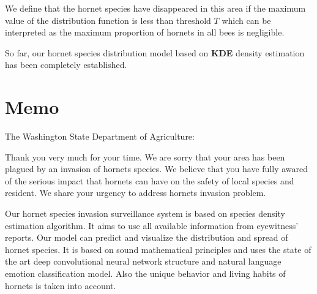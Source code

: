 \documentclass[12pt]{article}
\begin{document}
We define that the hornet species have disappeared in this area if the maximum value of the distribution function is less than threshold $T$ which can be interpreted as the maximum proportion of hornets in all bees is negligible.

So far, our hornet species distribution model based on \textbf{KDE} density estimation has been completely established.

\clearpage
\section*{Memo}

\begin{flushleft}
	The Washington State Department of Agriculture:
\end{flushleft}

Thank you very much for your time. We are sorry that your area has been plagued by an invasion of hornets species. We believe that you have fully awared of the serious impact that hornets can have on the safety of local species and resident. We share your urgency to address hornets invasion problem.

Our hornet species invasion surveillance system is based on species density estimation algorithm. It aims to use all available information from eyewitness' reports. Our model can predict and visualize the distribution and spread of hornet species. It is based on sound mathematical principles and uses the state of the art deep convolutional neural network structure and natural language emotion classification model. Also the unique behavior and living habits of hornets is taken into account.
\end{document}
